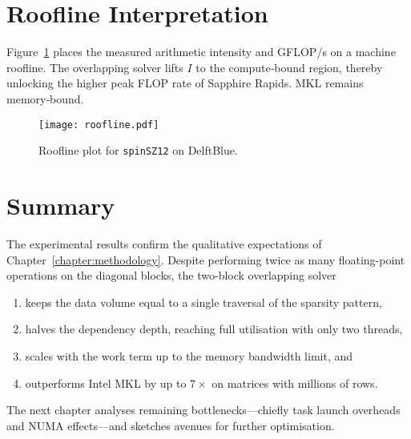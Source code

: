 \section{Roofline Interpretation}\label{sec:roofline}
Figure~\ref{fig:roofline} places the measured arithmetic intensity and
GFLOP/s on a machine roofline.  The overlapping solver lifts
\(I\) to the compute‐bound region, thereby unlocking the higher
peak FLOP rate of Sapphire Rapids.  MKL remains memory‐bound.

\begin{figure}[ht]
  \centering
  \texttt{[image: roofline.pdf]}
  \caption{Roofline plot for \texttt{spinSZ12} on DelftBlue.}
  \label{fig:roofline}
\end{figure}

\section{Summary}
The experimental results confirm the qualitative expectations of
Chapter~\ref{chapter:methodology}.  Despite performing twice as many
floating-point operations on the diagonal blocks, the two-block
overlapping solver

\begin{enumerate}
  \item keeps the data volume equal to a single traversal of the
        sparsity pattern,
  \item halves the dependency depth, reaching full utilisation with
        only two threads,
  \item scales with the work term up to the memory bandwidth limit, and
  \item outperforms Intel MKL by up to \(7\times\) on matrices with
        millions of rows.
\end{enumerate}

The next chapter analyses remaining bottlenecks—chiefly task launch
overheads and NUMA effects—and sketches avenues for further
optimisation.
